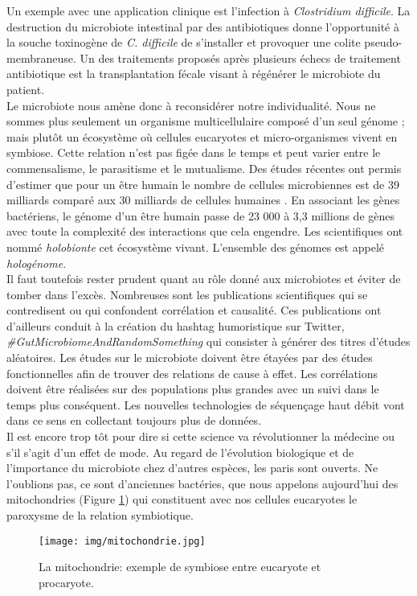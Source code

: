 \documentclass[12pt,a4paper]{article}
\begin{document}
Un exemple avec une application clinique est l'infection à \textit{Clostridium difficile}. La destruction du microbiote intestinal par des antibiotiques donne l'opportunité à la souche toxinogène de \textit{C. difficile} de s'installer et provoquer une colite pseudo-membraneuse. Un des traitements proposés après plusieurs échecs de traitement antibiotique est la transplantation fécale visant à régénérer le microbiote du patient. \\
Le microbiote nous amène donc à reconsidérer notre individualité. Nous ne sommes plus seulement un organisme multicellulaire composé d'un seul génome ; mais plutôt un écosystème où cellules eucaryotes et micro-organismes vivent en symbiose. Cette relation n'est pas figée dans le temps et peut varier entre le commensalisme, le parasitisme et le mutualisme. Des études récentes ont permis d'estimer que pour un être humain le nombre de cellules microbiennes est de 39 milliards comparé aux 30 milliards de cellules humaines \cite{Sender2016}. En associant les gènes bactériens, le génome d’un être humain passe de 23 000  à 3,3 millions de gènes \cite{Qin2010} avec toute la complexité des interactions que cela engendre. Les scientifiques ont nommé \textit{holobionte} cet écosystème vivant. L'ensemble des génomes est appelé \textit{hologénome}. \\
Il faut toutefois rester prudent quant au rôle donné aux microbiotes et éviter de tomber dans l'excès. Nombreuses sont les publications scientifiques qui se contredisent ou qui confondent corrélation et causalité. Ces publications ont d'ailleurs conduit à la création du hashtag humoristique sur Twitter, \textit{\#GutMicrobiomeAndRandomSomething} qui consister à générer des titres d'études aléatoires.
Les études sur le microbiote doivent être étayées par des études fonctionnelles afin de trouver des relations de cause à effet. Les corrélations doivent être réalisées sur des populations plus grandes avec un suivi dans le temps plus conséquent. Les nouvelles technologies de séquençage haut débit vont dans ce sens en collectant toujours plus de données.\\
Il est encore trop tôt pour dire si cette science va révolutionner la médecine ou s’il s'agit d'un effet de mode. Au regard de l'évolution biologique et de l'importance du microbiote chez d'autres espèces, les paris sont ouverts. Ne l'oublions pas, ce sont d'anciennes bactéries, que nous appelons aujourd'hui des mitochondries (Figure \ref{mitochondrie}) qui constituent avec nos cellules eucaryotes le paroxysme de la relation symbiotique.
\begin{figure}[ht]
\begin{center}
\texttt{[image: img/mitochondrie.jpg]}\hfill
\end{center}
\caption{La mitochondrie: exemple de symbiose entre eucaryote et procaryote.}
\label{mitochondrie}
\end{figure}
\end{document}
